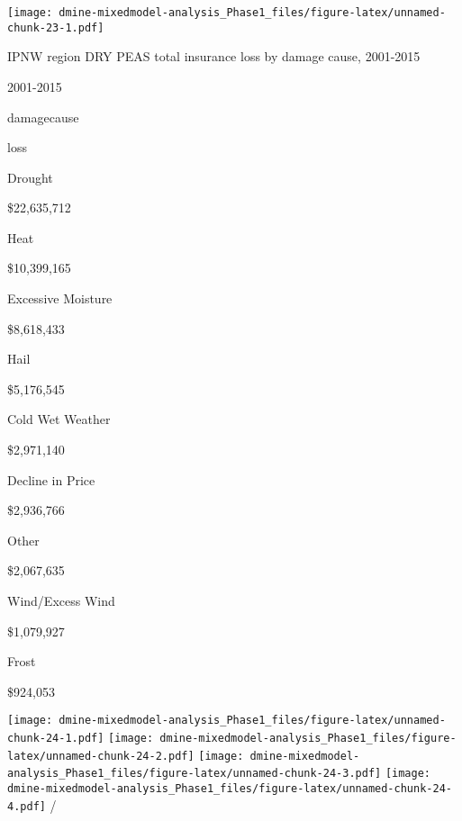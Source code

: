 \documentclass[]{article}
\begin{document}
\texttt{[image: dmine-mixedmodel-analysis\_Phase1\_files/figure-latex/unnamed-chunk-23-1.pdf]}

IPNW region DRY PEAS total insurance loss by damage cause, 2001-2015

2001-2015

damagecause

loss

Drought

\$22,635,712

Heat

\$10,399,165

Excessive Moisture

\$8,618,433

Hail

\$5,176,545

Cold Wet Weather

\$2,971,140

Decline in Price

\$2,936,766

Other

\$2,067,635

Wind/Excess Wind

\$1,079,927

Frost

\$924,053

\texttt{[image: dmine-mixedmodel-analysis\_Phase1\_files/figure-latex/unnamed-chunk-24-1.pdf]}
\texttt{[image: dmine-mixedmodel-analysis\_Phase1\_files/figure-latex/unnamed-chunk-24-2.pdf]}
\texttt{[image: dmine-mixedmodel-analysis\_Phase1\_files/figure-latex/unnamed-chunk-24-3.pdf]}
\texttt{[image: dmine-mixedmodel-analysis\_Phase1\_files/figure-latex/unnamed-chunk-24-4.pdf]}
/
\end{document}

